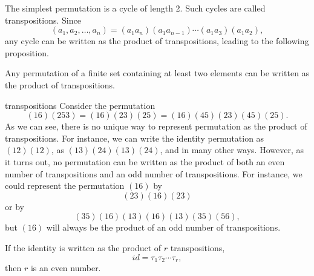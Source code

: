 The simplest permutation is a cycle of length 2. Such
cycles are called  {\bfi transpositions}. Since
\[
(a_1, a_2, \ldots, a_n ) = (a_1 a_n ) (a_1 a_{n-1} ) \cdots ( a_1 a_3 )
(a_1 a_2 ),
\]
any cycle can be written as the product of transpositions, leading to
the following proposition. 

\begin{proposition}
Any permutation of a finite set containing at least two elements can
be written as the product of transpositions. 
\end{proposition}

\begin{example}{transpositions}
Consider the permutation
\[
( 1 6 ) (2 5 3) = (1 6 )( 2 3 )( 2 5 ) 
= (1 6 )( 4 5 )(2 3 )( 4 5 )(2 5 ).
\]
As we can see, there is no unique way to represent permutation as the
product of transpositions. For instance, we can write the identity 
permutation as $(1 2 )(1 2 )$, as $(1 3 )(2 4 )(1 3 )( 2 4 )$, and in
many other ways. However, as it turns out, no permutation can be
written as the product of both an even number of transpositions and an
odd number of transpositions. For instance, we could represent the
permutation $(1 6)$ by
\[
(2 3 )(1 6)( 2 3)
\]
or by
\[
(3 5) (1 6) (1 3) (1 6) (1 3) (3 5) (5 6),
\]
but $(1 6)$ will always be the product of an odd number of 
transpositions.
\end{example}
 
\begin{lemma}\label{identity_even_trans}
If the identity is written as the product of $r$ transpositions,
\[
id = \tau_1 \tau_2 \cdots \tau_r,
\]
then $r$ is an even number.
\end{lemma}
 
